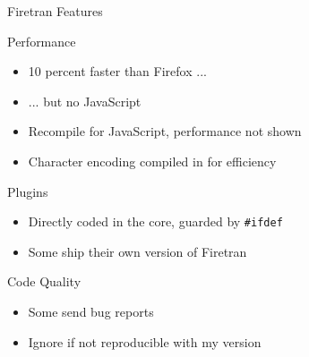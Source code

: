 

\begin{frame}[fragile]{Firetran Features}

\begin{block}{Performance}
 \begin{itemize}
  \item 10 percent faster than Firefox ...
  \item ... but no JavaScript
  \item Recompile for JavaScript, performance not shown
  \item Character encoding compiled in for efficiency
 \end{itemize}
\end{block}

\begin{block}{Plugins}
 \begin{itemize}
  \item Directly coded in the core, guarded by \lstinline|#ifdef|
  \item Some ship their own version of Firetran
 \end{itemize}
\end{block}

\begin{block}{Code Quality}
 \begin{itemize}
  \item Some send bug reports
  \item Ignore if not reproducible with my version
 \end{itemize}
\end{block}

\end{frame}



